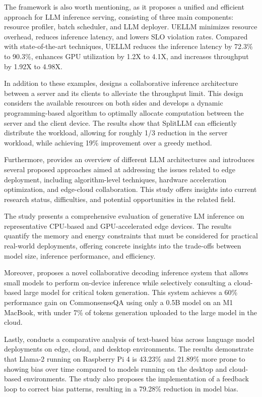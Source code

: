 \documentclass[11pt,a4paper]{article}
\begin{document}
The \cite{arxiv:2409.14961} framework is also worth mentioning, as it proposes a unified and efficient approach for LLM inference serving, consisting of three main components: resource profiler, batch scheduler, and LLM deployer. UELLM minimizes resource overhead, reduces inference latency, and lowers SLO violation rates. Compared with state-of-the-art techniques, UELLM reduces the inference latency by 72.3\% to 90.3\%, enhances GPU utilization by 1.2X to 4.1X, and increases throughput by 1.92X to 4.98X.

In addition to these examples, \cite{arxiv:2410.10759} designs a collaborative inference architecture between a server and its clients to alleviate the throughput limit. This design considers the available resources on both sides and develops a dynamic programming-based algorithm to optimally allocate computation between the server and the client device. The results show that SplitLLM can efficiently distribute the workload, allowing for roughly 1/3 reduction in the server workload, while achieving 19\% improvement over a greedy method.

Furthermore, \cite{doi:10.54097/jcb63r28} provides an overview of different LLM architectures and introduces several proposed approaches aimed at addressing the issues related to edge deployment, including algorithm-level techniques, hardware acceleration optimization, and edge-cloud collaboration. This study offers insights into current research status, difficulties, and potential opportunities in the related field.

The \cite{doi:10.1145/3788870} study presents a comprehensive evaluation of generative LM inference on representative CPU-based and GPU-accelerated edge devices. The results quantify the memory and energy constraints that must be considered for practical real-world deployments, offering concrete insights into the trade-offs between model size, inference performance, and efficiency.

Moreover, \cite{arxiv:2504.07878} proposes a novel collaborative decoding inference system that allows small models to perform on-device inference while selectively consulting a cloud-based large model for critical token generation. This system achieves a 60\% performance gain on CommonsenseQA using only a 0.5B model on an M1 MacBook, with under 7\% of tokens generation uploaded to the large model in the cloud.

Lastly, \cite{arxiv:2502.11349} conducts a comparative analysis of text-based bias across language model deployments on edge, cloud, and desktop environments. The results demonstrate that Llama-2 running on Raspberry Pi 4 is 43.23\% and 21.89\% more prone to showing bias over time compared to models running on the desktop and cloud-based environments. The study also proposes the implementation of a feedback loop to correct bias patterns, resulting in a 79.28\% reduction in model bias.
\end{document}
